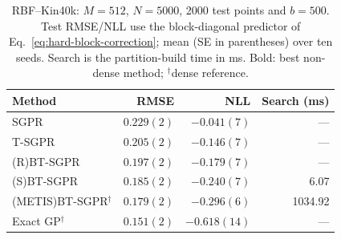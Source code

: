 \begin{table}[!ht]
\caption{RBF--Kin40k: \(M=512\), \(N=5000\), 2000 test points and \(b=500\). Test RMSE/NLL use the block-diagonal predictor of Eq.~\eqref{eq:hard-block-correction}; mean (SE in parentheses) over ten seeds. Search is the partition-build time in ms. Bold: best non-dense method; \(^\dagger\)dense reference.}
\label{tab:kin40k-sgpr}
\centering\footnotesize
\setlength{\tabcolsep}{3pt}
\begin{tabular}{@{}lrrr@{}}
\toprule
Method & RMSE & NLL & Search (ms) \\
\midrule
SGPR & $0.229(2)$ & $-0.041(7)$ & --- \\
T-SGPR & $0.205(2)$ & $-0.146(7)$ & --- \\
(R)BT-SGPR & $0.197(2)$ & $-0.179(7)$ & --- \\
(S)BT-SGPR & \textbf{$0.185(2)$} & \textbf{$-0.240(7)$} & 6.07 \\
\midrule
(METIS)BT-SGPR$^\dagger$ & $0.179(2)$ & $-0.296(6)$ & 1034.92 \\
Exact GP$^\dagger$ & $0.151(2)$ & $-0.618(14)$ & --- \\
\bottomrule
\end{tabular}
\end{table}
